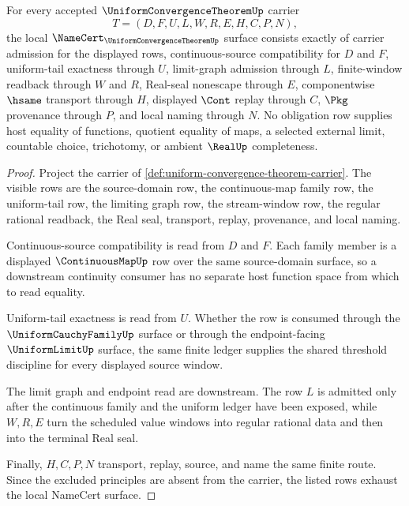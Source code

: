 \begin{theorem}
\label{thm:uniform-convergence-theorem-namecert-obligations}
For every accepted $\UniformConvergenceTheoremUp$ carrier
$$
T=(D,F,U,L,W,R,E,H,C,P,N),
$$
the local $\NameCert_{\UniformConvergenceTheoremUp}$ surface consists exactly of carrier admission for the displayed rows, continuous-source compatibility for $D$ and $F$, uniform-tail exactness through $U$, limit-graph admission through $L$, finite-window readback through $W$ and $R$, Real-seal nonescape through $E$, componentwise $\hsame$ transport through $H$, displayed $\Cont$ replay through $C$, $\Pkg$ provenance through $P$, and local naming through $N$. No obligation row supplies host equality of functions, quotient equality of maps, a selected external limit, countable choice, trichotomy, or ambient $\RealUp$ completeness.
\end{theorem}
\begin{proof}
Project the carrier of \autoref{def:uniform-convergence-theorem-carrier}. The visible rows are the source-domain row, the continuous-map family row, the uniform-tail row, the limiting graph row, the stream-window row, the regular rational readback, the Real seal, transport, replay, provenance, and local naming.

Continuous-source compatibility is read from $D$ and $F$. Each family member is a displayed $\ContinuousMapUp$ row over the same source-domain surface, so a downstream continuity consumer has no separate host function space from which to read equality.

Uniform-tail exactness is read from $U$. Whether the row is consumed through the $\UniformCauchyFamilyUp$ surface or through the endpoint-facing $\UniformLimitUp$ surface, the same finite ledger supplies the shared threshold discipline for every displayed source window.

The limit graph and endpoint read are downstream. The row $L$ is admitted only after the continuous family and the uniform ledger have been exposed, while $W,R,E$ turn the scheduled value windows into regular rational data and then into the terminal Real seal.

Finally, $H,C,P,N$ transport, replay, source, and name the same finite route. Since the excluded principles are absent from the carrier, the listed rows exhaust the local NameCert surface.
\end{proof}

